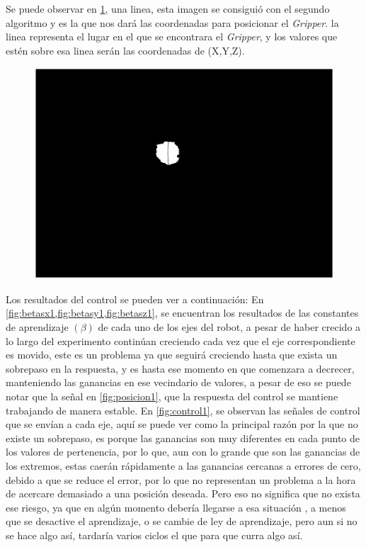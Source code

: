 Se puede observar en \cref{fig:erz1}, una linea, esta imagen se consiguió con el segundo algoritmo y es la que nos dará las coordenadas para posicionar el \textit{Gripper}. la linea representa el lugar en el que se encontrara el \textit{Gripper}, y los valores que estén sobre esa linea serán las coordenadas de (X,Y,Z). 
\begin{figure}
	\centering
	\includegraphics[width=1\linewidth]{visio/graficasderesultados/erz1}
	\caption{}
	\label{fig:erz1}
\end{figure}


\clearpage

Los resultados del control se pueden ver a continuación:
En \cref{fig:betasx1,fig:betasy1,fig:betasz1}, se encuentran los resultados de las constantes de aprendizaje $(\beta)$ de cada uno de los ejes del robot, a pesar de haber crecido a lo largo del experimento continúan creciendo cada vez que el eje correspondiente es movido, este es un problema ya que seguirá creciendo hasta que exista un sobrepaso en la respuesta, y es hasta ese momento en que comenzara a decrecer, manteniendo las ganancias en ese vecindario de valores, a pesar de eso se puede notar que la señal en \cref{fig:posicion1}, que la respuesta del control se mantiene trabajando de manera estable.
En \cref{fig:control1}, se observan las señales de control que se envían a cada eje, aquí se puede ver como la principal razón por la que no existe un sobrepaso, es porque las ganancias son muy  diferentes en cada punto de los valores de pertenencia, por lo que, aun con lo grande que son las ganancias de los extremos, estas caerán rápidamente a las ganancias cercanas a errores de cero, debido a que se reduce el error, por lo que no representan un problema a la hora de acercare demasiado a una posición deseada.
Pero eso no significa que no exista ese riesgo, ya que en algún momento debería llegarse a esa situación , a menos que se desactive el aprendizaje, o se cambie de ley de aprendizaje, pero aun si no se hace algo así, tardaría varios ciclos el que para que curra algo así.

